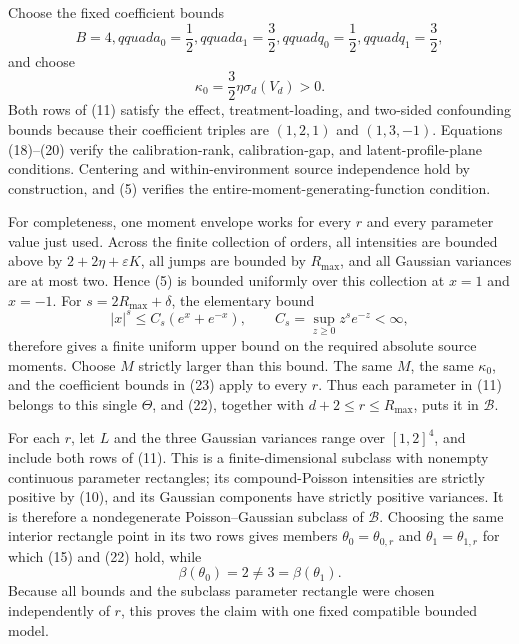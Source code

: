 Choose the fixed coefficient bounds
\[
 B=4,qquad a_0=\frac12,qquad a_1=\frac32,qquad
 q_0=\frac12,qquad q_1=\frac32,
 \tag{23}
\]
and choose
\[
 \kappa_0=\frac32\eta\sigma_d(V_d)>0.
 \tag{24}
\]
Both rows of (11) satisfy the effect, treatment-loading, and two-sided confounding bounds because their coefficient triples are \((1,2,1)\) and \((1,3,-1)\).  Equations (18)--(20) verify the calibration-rank, calibration-gap, and latent-profile-plane conditions.  Centering and within-environment source independence hold by construction, and (5) verifies the entire-moment-generating-function condition.

For completeness, one moment envelope works for every \(r\) and every parameter value just used.  Across the finite collection of orders, all intensities are bounded above by \(2+2\eta+\varepsilon K\), all jumps are bounded by \(R_{\max}\), and all Gaussian variances are at most two.  Hence (5) is bounded uniformly over this collection at \(x=1\) and \(x=-1\).  For \(s=2R_{\max}+\delta\), the elementary bound
\[
 |x|^s\leq C_s(e^x+e^{-x}),
 \qquad
 C_s=\sup_{z\geq0}z^se^{-z}<\infty,
 \tag{25}
\]
therefore gives a finite uniform upper bound on the required absolute source moments.  Choose \(M\) strictly larger than this bound.  The same \(M\), the same \(\kappa_0\), and the coefficient bounds in (23) apply to every \(r\).  Thus each parameter in (11) belongs to this single \(\Theta\), and (22), together with \(d+2\leq r\leq R_{\max}\), puts it in \(\mathcal B\).

For each \(r\), let \(L\) and the three Gaussian variances range over \([1,2]^4\), and include both rows of (11).  This is a finite-dimensional subclass with nonempty continuous parameter rectangles; its compound-Poisson intensities are strictly positive by (10), and its Gaussian components have strictly positive variances.  It is therefore a nondegenerate Poisson--Gaussian subclass of \(\mathcal B\).  Choosing the same interior rectangle point in its two rows gives members \(\theta_0=\theta_{0,r}\) and \(\theta_1=\theta_{1,r}\) for which (15) and (22) hold, while
\[
 \beta(\theta_0)=2\neq3=\beta(\theta_1).
\]
Because all bounds and the subclass parameter rectangle were chosen independently of \(r\), this proves the claim with one fixed compatible bounded model.
